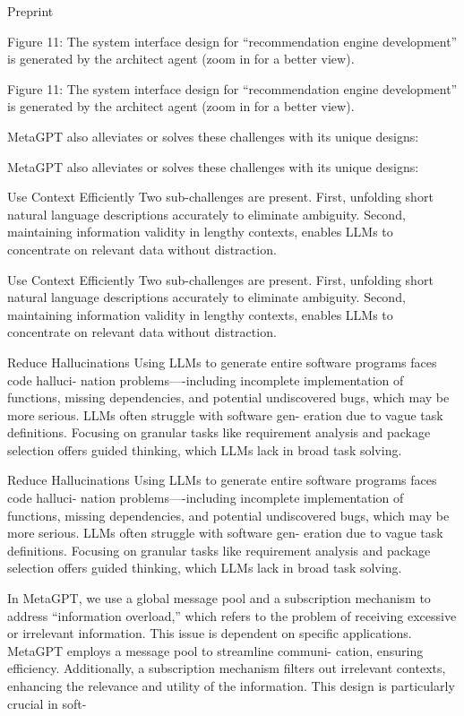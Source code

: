 \documentclass[12pt]{article}
\begin{document}
Preprint


Figure 11: The system interface design for “recommendation engine development” is generated by
the architect agent (zoom in for a better view).


Figure 11: The system interface design for “recommendation engine development” is generated by
the architect agent (zoom in for a better view).


MetaGPT also alleviates or solves these challenges with its unique designs:


MetaGPT also alleviates or solves these challenges with its unique designs:


Use Context Efficiently Two sub-challenges are present. First, unfolding short natural language
descriptions accurately to eliminate ambiguity. Second, maintaining information validity in lengthy
contexts, enables LLMs to concentrate on relevant data without distraction.


Use Context Efficiently Two sub-challenges are present. First, unfolding short natural language
descriptions accurately to eliminate ambiguity. Second, maintaining information validity in lengthy
contexts, enables LLMs to concentrate on relevant data without distraction.


Reduce Hallucinations Using LLMs to generate entire software programs faces code halluci-
nation problems—-including incomplete implementation of functions, missing dependencies, and
potential undiscovered bugs, which may be more serious. LLMs often struggle with software gen-
eration due to vague task definitions. Focusing on granular tasks like requirement analysis and
package selection offers guided thinking, which LLMs lack in broad task solving.


Reduce Hallucinations Using LLMs to generate entire software programs faces code halluci-
nation problems—-including incomplete implementation of functions, missing dependencies, and
potential undiscovered bugs, which may be more serious. LLMs often struggle with software gen-
eration due to vague task definitions. Focusing on granular tasks like requirement analysis and
package selection offers guided thinking, which LLMs lack in broad task solving.


In MetaGPT, we use a global message pool and a subscription mechanism to address “information
overload,” which refers to the problem of receiving excessive or irrelevant information. This issue
is dependent on specific applications. MetaGPT employs a message pool to streamline communi-
cation, ensuring efficiency. Additionally, a subscription mechanism filters out irrelevant contexts,
enhancing the relevance and utility of the information. This design is particularly crucial in soft-
\end{document}
